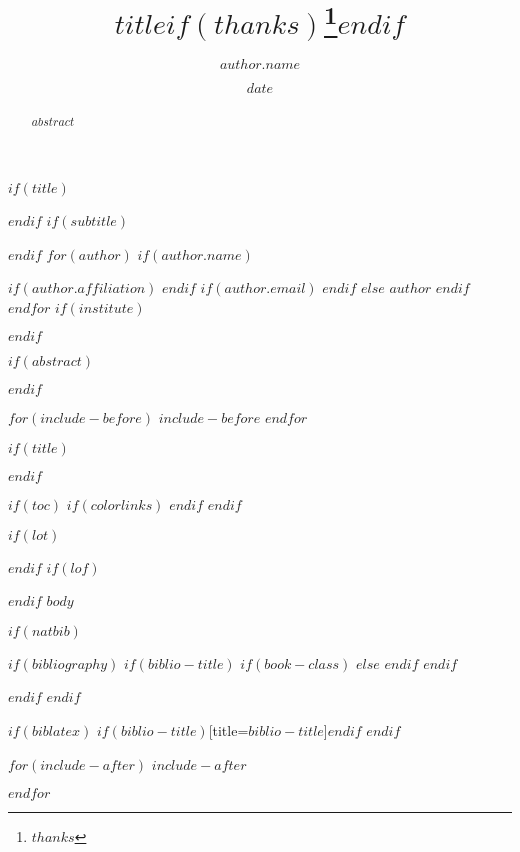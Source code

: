 \documentclass[$if(fontsize)$$fontsize$,$endif$$if(lang)$$babel-lang$,$endif$$if(papersize)$$papersize$paper,$endif$$if(beamer)$ignorenonframetext,$if(handout)$handout,$endif$$if(aspectratio)$aspectratio=$aspectratio$,$endif$$endif$$for(classoption)$$classoption$$sep$,$endfor$]{$documentclass$}
\begin{document}
$if(title)$
\title{$title$$if(thanks)$\thanks{$thanks$}$endif$}
$endif$
$if(subtitle)$
\providecommand{\subtitle}[1]{}
\subtitle{$subtitle$}
$endif$
$for(author)$
$if(author.name)$
\author{$author.name$}
$if(author.affiliation)$
$endif$
$if(author.email)$
$endif$
$else$
$author$
$endif$
$endfor$
$if(institute)$
\providecommand{\institute}[1]{}
\institute{$for(institute)$$institute$$sep$ \and $endfor$}
$endif$
\date{$date$}

$if(abstract)$
\begin{abstract}
$abstract$
\end{abstract}
$endif$

$for(include-before)$
$include-before$
$endfor$

$if(title)$
\maketitle
$endif$

\providecommand{\tightlist}{%
  \setlength{\itemsep}{0pt}\setlength{\parskip}{0pt}}


$if(toc)$
{
$if(colorlinks)$
\hypersetup{linkcolor=$if(toccolor)$$toccolor$$else$$endif$}
$endif$
\setcounter{tocdepth}{$toc-depth$}
\tableofcontents
}
$endif$

$if(lot)$
\listoftables
$endif$
$if(lof)$
\listoffigures
$endif$
$body$

$if(natbib)$

  $if(bibliography)$
    $if(biblio-title)$
      $if(book-class)$
         \renewcommand\bibname{$biblio-title$}
      $else$
         \renewcommand\refname{$biblio-title$}
      $endif$
    $endif$

    

  $endif$
$endif$

$if(biblatex)$
\printbibliography$if(biblio-title)$[title=$biblio-title$]$endif$
$endif$

$for(include-after)$
$include-after$

$endfor$
\end{document}
